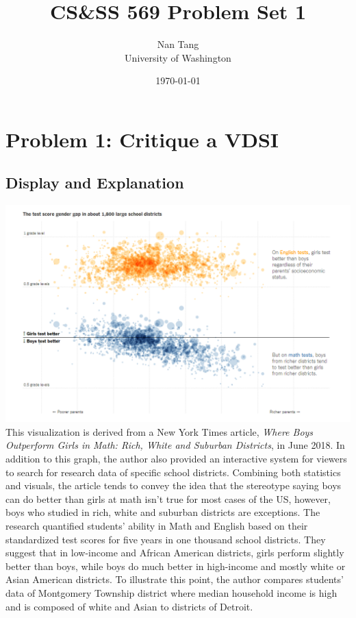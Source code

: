\documentclass[11pt,letterpaper]{article}
\title{CS\&SS 569 Problem Set 1}
\author{Nan Tang \\ University of Washington}
\date{\today}
\begin{document}
\maketitle

\section*{Problem 1: Critique a VDSI}
\subsection*{Display and Explanation}

\includegraphics[scale=0.5]{display-1.png} \\

\noindent This visualization is derived from a New York Times article, \textit{Where Boys Outperform Girls in Math: Rich, White and Suburban Districts}, in June 2018. In addition to this graph, the author also provided an interactive system for viewers to search for research data of specific school districts. Combining both statistics and visuals, the article tends to convey the idea that the stereotype saying boys can do better than girls at math isn’t true for most cases of the US, however, boys who studied in rich, white and suburban districts are exceptions. The research quantified students’ ability in Math and English based on their standardized test scores for five years in one thousand school districts. They suggest that in low-income and African American districts, girls perform slightly better than boys, while boys do much better in high-income and mostly white or Asian American districts. To illustrate this point, the author compares students’ data of Montgomery Township district where median household income is high and is composed of white and Asian to districts of Detroit.
\end{document}
